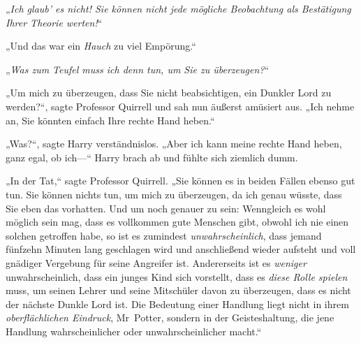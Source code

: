 „\emph{Ich glaub’ es nicht! Sie können nicht jede mögliche Beobachtung als Bestätigung Ihrer Theorie werten!}“

„Und das war ein \emph{Hauch} zu viel Empörung.“

„\emph{Was zum Teufel muss ich denn tun, um Sie zu überzeugen?}“

„Um mich zu überzeugen, dass Sie nicht beabsichtigen, ein Dunkler Lord zu werden?“, sagte Professor Quirrell und sah nun äußerst amüsiert aus. „Ich nehme an, Sie könnten einfach Ihre rechte Hand heben.“

„Was?“, sagte Harry verständnislos. „Aber ich kann meine rechte Hand heben, ganz egal, ob ich—“ Harry brach ab und fühlte sich ziemlich dumm.

„In der Tat,“ sagte Professor Quirrell. „Sie können es in beiden Fällen ebenso gut tun. Sie können nichts tun, um mich zu überzeugen, da ich genau wüsste, dass Sie eben das vorhatten. Und um noch genauer zu sein: Wenngleich es wohl möglich sein mag, dass es vollkommen gute Menschen gibt, obwohl ich nie einen solchen getroffen habe, so ist es zumindest \emph{unwahrscheinlich}, dass jemand fünfzehn Minuten lang geschlagen wird und anschließend wieder aufsteht und voll gnädiger Vergebung für seine Angreifer ist. Andererseits ist es \emph{weniger} unwahrscheinlich, dass ein junges Kind sich vorstellt, dass es \emph{diese Rolle spielen} muss, um seinen Lehrer und seine Mitschüler davon zu überzeugen, dass es nicht der nächste Dunkle Lord ist. Die Bedeutung einer Handlung liegt nicht in ihrem \emph{oberflächlichen Eindruck}, Mr~Potter, sondern in der Geisteshaltung, die jene Handlung wahrscheinlicher oder unwahrscheinlicher macht.“

